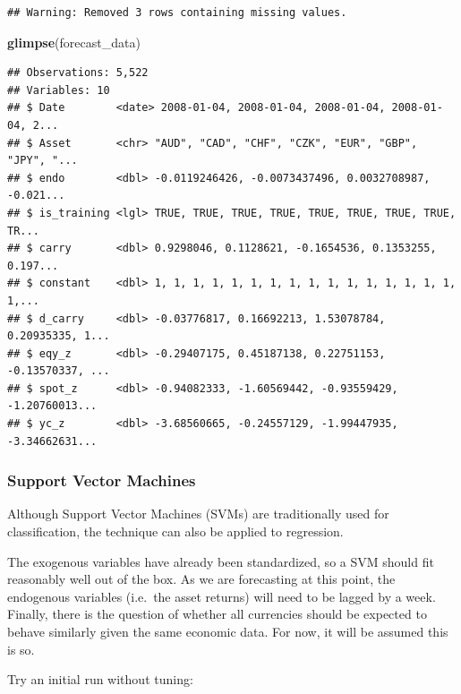 \documentclass[]{article}
\newenvironment{Shaded}{\begin{snugshade}}{\end{snugshade}}
\newcommand{\KeywordTok}[1]{\textcolor[rgb]{0.13,0.29,0.53}{\textbf{#1}}}
\newcommand{\NormalTok}[1]{#1}
\begin{document}
\begin{verbatim}
## Warning: Removed 3 rows containing missing values.
\end{verbatim}

\begin{Shaded}
\begin{Highlighting}[]
\KeywordTok{glimpse}\NormalTok{(forecast_data)}
\end{Highlighting}
\end{Shaded}

\begin{verbatim}
## Observations: 5,522
## Variables: 10
## $ Date        <date> 2008-01-04, 2008-01-04, 2008-01-04, 2008-01-04, 2...
## $ Asset       <chr> "AUD", "CAD", "CHF", "CZK", "EUR", "GBP", "JPY", "...
## $ endo        <dbl> -0.0119246426, -0.0073437496, 0.0032708987, -0.021...
## $ is_training <lgl> TRUE, TRUE, TRUE, TRUE, TRUE, TRUE, TRUE, TRUE, TR...
## $ carry       <dbl> 0.9298046, 0.1128621, -0.1654536, 0.1353255, 0.197...
## $ constant    <dbl> 1, 1, 1, 1, 1, 1, 1, 1, 1, 1, 1, 1, 1, 1, 1, 1, 1,...
## $ d_carry     <dbl> -0.03776817, 0.16692213, 1.53078784, 0.20935335, 1...
## $ eqy_z       <dbl> -0.29407175, 0.45187138, 0.22751153, -0.13570337, ...
## $ spot_z      <dbl> -0.94082333, -1.60569442, -0.93559429, -1.20760013...
## $ yc_z        <dbl> -3.68560665, -0.24557129, -1.99447935, -3.34662631...
\end{verbatim}

\subsubsection{Support Vector Machines}\label{support-vector-machines}

Although Support Vector Machines (SVMs) are traditionally used for
classification, the technique can also be applied to regression.

The exogenous variables have already been standardized, so a SVM should
fit reasonably well out of the box. As we are forecasting at this point,
the endogenous variables (i.e.~the asset returns) will need to be lagged
by a week. Finally, there is the question of whether all currencies
should be expected to behave similarly given the same economic data. For
now, it will be assumed this is so.

Try an initial run without tuning:
\end{document}
